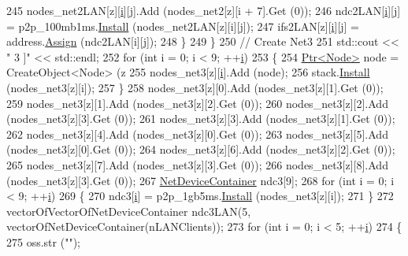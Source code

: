 \begin{DoxyCode}
245               nodes\_net2LAN[z][\hyperlink{bernuolliDistribution_8m_a6f6ccfcf58b31cb6412107d9d5281426}{i}][j].Add (nodes\_net2[z][i + 7].Get (0));
246               ndc2LAN[\hyperlink{bernuolliDistribution_8m_a6f6ccfcf58b31cb6412107d9d5281426}{i}][j] = p2p\_100mb1ms.\hyperlink{classns3_1_1PointToPointHelper_ab9162fea3e88722666fed1106df1f9ec}{Install} (nodes\_net2LAN[z][i][j]);
247               ifs2LAN[z][\hyperlink{bernuolliDistribution_8m_a6f6ccfcf58b31cb6412107d9d5281426}{i}][j] = address.\hyperlink{classns3_1_1Ipv4AddressHelper_af8e7f4a1a7e74c00014a1eac445a27af}{Assign} (ndc2LAN[i][j]);
248             \}
249         \}
250       \textcolor{comment}{// Create Net3}
251       std::cout << \textcolor{stringliteral}{" 3 ]"} << std::endl;
252       \textcolor{keywordflow}{for} (\textcolor{keywordtype}{int} i = 0; i < 9; ++\hyperlink{bernuolliDistribution_8m_a6f6ccfcf58b31cb6412107d9d5281426}{i})
253         \{
254           \hyperlink{classns3_1_1Ptr}{Ptr<Node>} node = CreateObject<Node> (z %
255           nodes\_net3[z][\hyperlink{bernuolliDistribution_8m_a6f6ccfcf58b31cb6412107d9d5281426}{i}].Add (node);
256           stack.\hyperlink{classns3_1_1InternetStackHelper_a6645b412f31283d2d9bc3d8a95cebbc0}{Install} (nodes\_net3[z][i]);
257         \}
258       nodes\_net3[z][0].Add (nodes\_net3[z][1].Get (0));
259       nodes\_net3[z][1].Add (nodes\_net3[z][2].Get (0));
260       nodes\_net3[z][2].Add (nodes\_net3[z][3].Get (0));
261       nodes\_net3[z][3].Add (nodes\_net3[z][1].Get (0));
262       nodes\_net3[z][4].Add (nodes\_net3[z][0].Get (0));
263       nodes\_net3[z][5].Add (nodes\_net3[z][0].Get (0));
264       nodes\_net3[z][6].Add (nodes\_net3[z][2].Get (0));
265       nodes\_net3[z][7].Add (nodes\_net3[z][3].Get (0));
266       nodes\_net3[z][8].Add (nodes\_net3[z][3].Get (0));
267       \hyperlink{classns3_1_1NetDeviceContainer}{NetDeviceContainer} ndc3[9];
268       \textcolor{keywordflow}{for} (\textcolor{keywordtype}{int} i = 0; i < 9; ++\hyperlink{bernuolliDistribution_8m_a6f6ccfcf58b31cb6412107d9d5281426}{i})
269         \{
270           ndc3[\hyperlink{bernuolliDistribution_8m_a6f6ccfcf58b31cb6412107d9d5281426}{i}] = p2p\_1gb5ms.\hyperlink{classns3_1_1PointToPointHelper_ab9162fea3e88722666fed1106df1f9ec}{Install} (nodes\_net3[z][i]);
271         \}
272       vectorOfVectorOfNetDeviceContainer ndc3LAN(5, vectorOfNetDeviceContainer(nLANClients));
273       \textcolor{keywordflow}{for} (\textcolor{keywordtype}{int} i = 0; i < 5; ++\hyperlink{bernuolliDistribution_8m_a6f6ccfcf58b31cb6412107d9d5281426}{i})
274         \{
275           oss.str (\textcolor{stringliteral}{""});

\end{DoxyCode}
